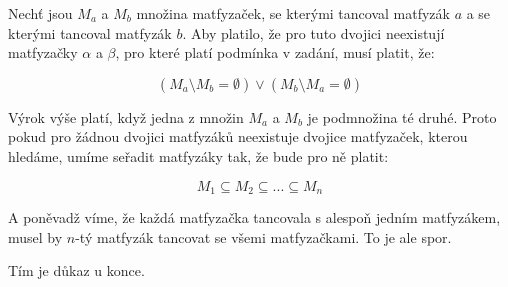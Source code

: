 \documentclass{fkssolpub}
\author{Ondřej Sedláček}
\begin{document}
 

Nechť jsou $M_a$ a $M_b$ množina matfyzaček, se kterými tancoval
matfyzák $a$ a se kterými tancoval matfyzák $b$. Aby platilo,
že pro tuto dvojici neexistují matfyzačky $\alpha$ a $\beta$, pro které
platí podmínka v zadání, musí platit, že:

\[
  (M_a \setminus M_b = \emptyset) \lor (M_b \setminus M_a = \emptyset)
\]

Výrok výše platí, když jedna z množin $M_a$ a $M_b$ je podmnožina té druhé.
Proto pokud pro žádnou dvojici matfyzáků neexistuje dvojice matfyzaček,
kterou hledáme, umíme seřadit matfyzáky tak, že bude pro ně platit:

\[
  M_1 \subseteq M_2 \subseteq ... \subseteq M_n
\]

A poněvadž víme, že každá matfyzačka tancovala s alespoň jedním matfyzákem,
musel by $n$-tý matfyzák tancovat se všemi matfyzačkami. To je ale spor.

Tím je důkaz u konce.
\end{document}
